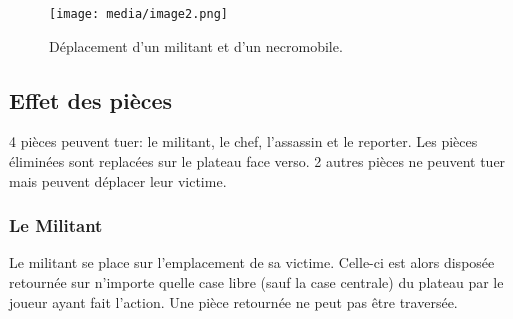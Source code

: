 \documentclass{article}
\begin{document}
\vspace{20pt} %

\begin{center}
\begin{figure}[ht]
\centering
\texttt{[image: media/image2.png]}
\caption{Déplacement d'un militant et d'un necromobile.}
\end{figure}
    

\end{center}

\newpage

\subsection{Effet des pièces}
4 pièces peuvent tuer: le militant, le chef, l'assassin et le reporter. Les pièces éliminées sont replacées sur le plateau face verso.
2 autres pièces ne peuvent tuer mais peuvent déplacer leur victime.
\vspace{20pt} %


\subsubsection{Le Militant}
Le militant se place sur l'emplacement de sa victime. Celle-ci est alors disposée retournée sur n'importe quelle case libre (sauf la case centrale) du plateau 
par le joueur ayant fait l'action. Une pièce retournée ne peut pas être traversée.
\end{document}
